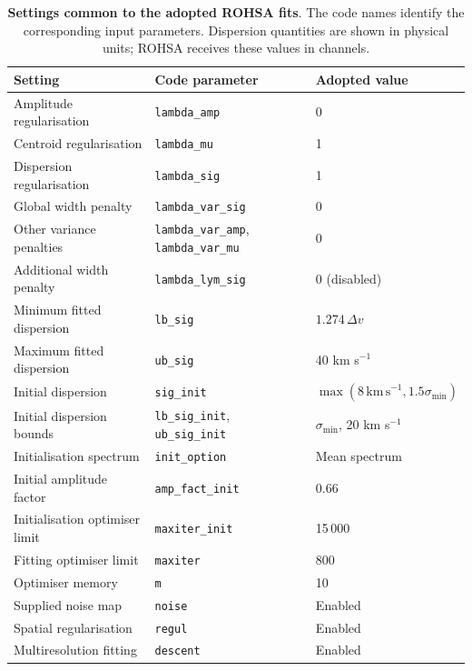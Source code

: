 
\begin{table}[H]
\centering
\caption{\textbf{Settings common to the adopted ROHSA fits}. The code names identify the corresponding input parameters. Dispersion quantities are shown in physical units; ROHSA receives these values in channels.}
\label{tab:rohsa_common_parameters}
\begingroup

\small
\renewcommand{\arraystretch}{1.2}
\begin{tabular}{lll}
\toprule
Setting & Code parameter & Adopted value \\
\midrule
Amplitude regularisation & \texttt{lambda\_amp} & 0 \\
Centroid regularisation & \texttt{lambda\_mu} & 1 \\
Dispersion regularisation & \texttt{lambda\_sig} & 1 \\
Global width penalty & \texttt{lambda\_var\_sig} & 0 \\
Other variance penalties & \texttt{lambda\_var\_amp}, \texttt{lambda\_var\_mu} & 0 \\
Additional width penalty & \texttt{lambda\_lym\_sig} & 0 (disabled) \\
Minimum fitted dispersion & \texttt{lb\_sig} & $1.274\,\Delta v$ \\
Maximum fitted dispersion & \texttt{ub\_sig} & 40 km s$^{-1}$ \\
Initial dispersion & \texttt{sig\_init} & $\max(8\,\mathrm{km\,s}^{-1},1.5\sigma_{\min})$ \\
Initial dispersion bounds & \texttt{lb\_sig\_init}, \texttt{ub\_sig\_init} & $\sigma_{\min}$, 20 km s$^{-1}$ \\
Initialisation spectrum & \texttt{init\_option} & Mean spectrum \\
Initial amplitude factor & \texttt{amp\_fact\_init} & 0.66 \\
Initialisation optimiser limit & \texttt{maxiter\_init} & 15\,000 \\
Fitting optimiser limit & \texttt{maxiter} & 800 \\
Optimiser memory & \texttt{m} & 10 \\
Supplied noise map & \texttt{noise} & Enabled \\
Spatial regularisation & \texttt{regul} & Enabled \\
Multiresolution fitting & \texttt{descent} & Enabled \\
\bottomrule
\end{tabular}
\endgroup
\end{table}
